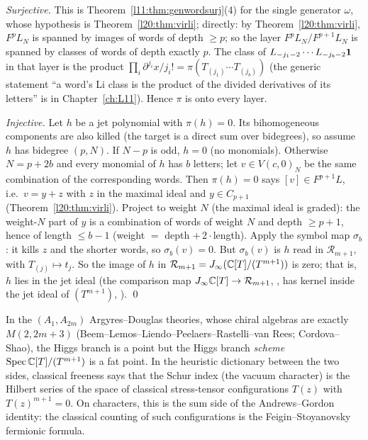 \emph{Surjective.} This is Theorem~\ref{l11:thm:genwordsurj}(4) for the single generator $\omega$, whose hypothesis is
Theorem~\ref{l20:thm:virli}; directly: by Theorem~\ref{l20:thm:virli}, $F^pL_N$ is spanned by images of words of depth $\ge p$; so the layer
$F^pL_N/F^{p+1}L_N$ is spanned by classes of words of depth exactly $p$. The class of
$L_{-j_1-2}\cdots L_{-j_b-2}\mathbf{1}$ in that layer is the product $\prod_i\partial^{j_i}x/j_i!=\pi(T_{(j_1)}\cdots T_{(j_b)})$
(the generic statement ``a word's Li class is the product of the divided derivatives of its letters'' is in
Chapter~\ref{ch:L11}). Hence $\pi$ is onto every layer.

\emph{Injective.} Let $h$ be a jet polynomial with $\pi(h)=0$. Its bihomogeneous components are also killed (the target is
a direct sum over bidegrees), so assume $h$ has bidegree $(p,N)$. If $N-p$ is odd, $h=0$ (no monomials). Otherwise $N=p+2b$ and every
monomial of $h$ has $b$ letters; let $v\in V(c,0)_N$ be the same combination of the corresponding words. Then $\pi(h)=0$ says
$[v]\in F^{p+1}L$, i.e.\ $v=y+z$ with $z$ in the maximal ideal and $y\in C_{p+1}$ (Theorem~\ref{l20:thm:virli}). Project to weight
$N$ (the maximal ideal is graded): the weight-$N$ part of $y$ is a combination of words of weight $N$ and depth $\ge p+1$, hence of
length $\le b-1$ (weight $=$ depth $+\,2\cdot$length). Apply the symbol map $\sigma_b$: it kills $z$ and the shorter words, so
$\sigma_b(v)=0$. But $\sigma_b(v)$ is $h$ read in $\mathcal R_{m+1}$, with $T_{(j)}\mapsto t_j$. So the image of $h$ in
$\mathcal R_{m+1}=J_\infty({\mathbb{C}}[T]/(T^{m+1}))$ is zero; that is, $h$ lies in the jet ideal (the comparison map
$J_\infty{\mathbb{C}}[T]\to \mathcal R_{m+1}$, , has kernel inside the jet ideal of $(T^{m+1})$, ). \qed

\begin{physics}
In the $(A_1,A_{2m})$ Argyres--Douglas theories, whose chiral algebras are exactly $M(2,2m+3)$ (Beem--Lemos--Liendo--Peelaers--Rastelli--van
Rees; Cordova--Shao), the Higgs branch is a point but the Higgs branch \emph{scheme} $\operatorname{Spec}{\mathbb{C}}[T]/(T^{m+1})$ is a fat point.
In the heuristic dictionary between the two sides, classical freeness says that the Schur index (the vacuum character) is the
Hilbert series of the space of classical stress-tensor configurations $T(z)$ with $T(z)^{m+1}=0$. On characters, this is the sum side of the
Andrews--Gordon identity: the classical counting of such configurations is the Feigin--Stoyanovsky fermionic formula.
\end{physics}


